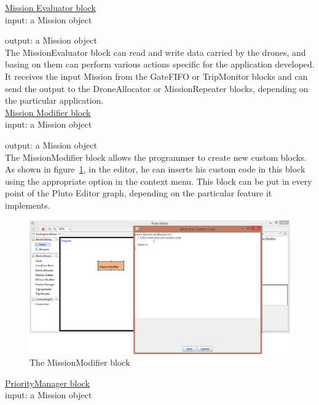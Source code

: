 \underline{Mission Evaluator block}
\\

input: a Mission object

output: a Mission object
\\

The MissionEvaluator block can read and write data carried by the drones, and basing on them can perform various actions specific for the application developed.
It receives the input Mission from the GateFIFO or TripMonitor blocks and can send the output to the DroneAllocator or MissionRepeater blocks, depending on the particular application.
\\

\underline{Mission Modifier block}\label{mm}
\\

input: a Mission object

output: a Mission object
\\

The MissionModifier block allows the programmer to create new custom blocks.
As shown in figure~\ref{fig:missionmodifier}, in the editor, he can inserts his custom code in this block using the appropriate option in the context menu.
This block can be put in every point of the Pluto Editor graph, depending on the particular feature it implements.
\\

\begin{figure}[H]
\centering
\includegraphics[width=\linewidth]
{pictures/MissionModifier.png}
  \caption{The MissionModifier block}
  \label{fig:missionmodifier}
\end{figure}

\underline{PriorityManager block}
\\

input: a Mission object

